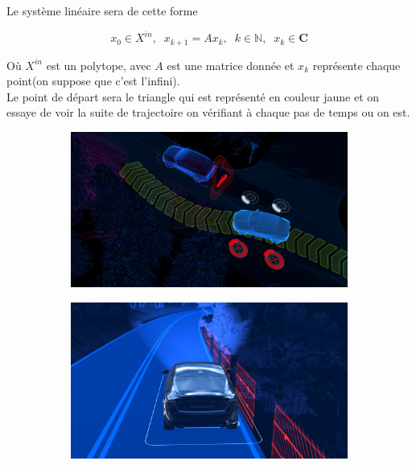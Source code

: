 Le système linéaire sera de cette forme 

\begin{equation}
 x_{0} \in X^{in}, \;\;   x_{k+1}= A x_{k} ,\;\;  k \in \mathbb{N}, \;\; x_{k} \in \textbf{C}
 \end{equation}  

Où $X^{in}$ est un polytope,  
avec $A$ est une matrice donnée et $x_{k}$ représente chaque point(on suppose que c’est l’infini).\\
Le point de départ sera le triangle qui est représenté en couleur jaune et on essaye de voir la suite de trajectoire on vérifiant à chaque pas de temps ou on est.\\

\begin{figure}[ht]
	\centering
	\begin{subfigure}{.48\textwidth}
		\includegraphics[width=.9\textwidth]{images/vhc1.JPG}
		\caption{}
		\label{fig:miror}
	\end{subfigure}\hfill%
	\begin{subfigure}{.48\textwidth}
		\includegraphics[width=.9\textwidth]{images/vhc2.jpg}
		\caption{}
		\label{fig:miror-couleur}
	\end{subfigure}
	\begin{subfigure}{.48\textwidth}

\end{subfigure}
\end{figure}
